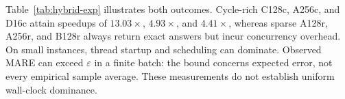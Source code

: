 Table~\ref{tab:hybrid-exp} illustrates both outcomes. Cycle-rich
C128c, A256c, and D16c attain speedups of $13.03\times$,
$4.93\times$, and $4.41\times$, whereas sparse A128r, A256r,
and B128r always return exact answers but incur concurrency overhead.
On small instances, thread startup and scheduling can dominate.
Observed MARE can exceed $\varepsilon$ in a finite batch: the bound
concerns expected error, not every empirical sample average.
These measurements do not establish uniform wall-clock dominance.
